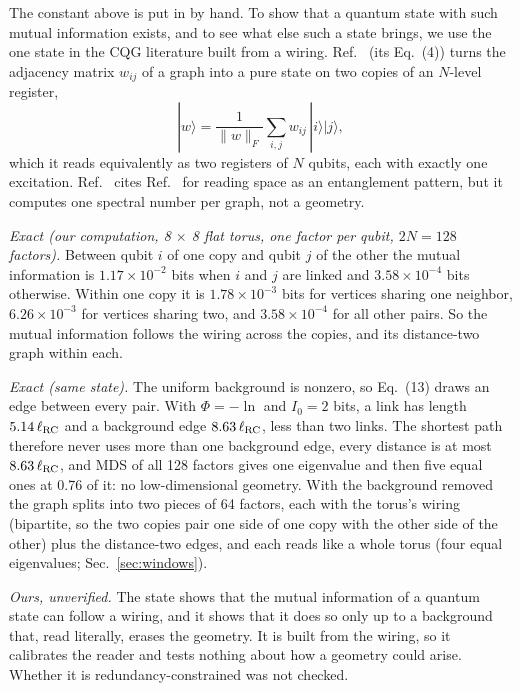 \documentclass[aps,pre,10pt,twocolumn,superscriptaddress,nofootinbib]{revtex4-2}
\begin{document}
The constant above is put in by hand. To show that a quantum state with such mutual information exists, and to see
what else such a state brings, we use the one state in the CQG literature built from a wiring. Ref.~\cite{DT17} (its
Eq.~(4)) turns the adjacency matrix $w_{ij}$ of a graph into a pure state on two copies of an $N$-level register,
\begin{equation*}
|w\rangle=\frac{1}{\lVert w\rVert_F}\sum_{i,j}w_{ij}\,|i\rangle|j\rangle ,
\end{equation*}
which it reads equivalently as two registers of $N$ qubits, each with exactly one excitation. Ref.~\cite{DT17}
cites Ref.~\cite{CCM16} for reading space as an entanglement pattern, but it computes one spectral number per
graph, not a geometry.

\emph{Exact (our computation, 8 $\times$ 8 flat torus, one factor per qubit, $2N=128$ factors).} Between qubit $i$ of
one copy and qubit $j$ of the other the mutual information is $1.17\times10^{-2}$ bits when $i$ and $j$ are linked and
$3.58\times10^{-4}$ bits otherwise. Within one copy it is $1.78\times10^{-3}$ bits for vertices sharing one neighbor,
$6.26\times10^{-3}$ for vertices sharing two, and $3.58\times10^{-4}$ for all other pairs. So the mutual information
follows the wiring across the copies, and its distance-two graph within each.

\emph{Exact (same state).} The uniform background is nonzero, so Eq.~(13) draws an edge between every pair. With
$\Phi=-\ln$ and $I_0=2$ bits, a link has length $5.14\,\ell_{\rm RC}$ and a background edge $8.63\,\ell_{\rm RC}$,
less than two links. The shortest path therefore never uses more than one background edge, every distance is at most
$8.63\,\ell_{\rm RC}$, and MDS of all 128 factors gives one eigenvalue and then five equal ones at 0.76 of it: no
low-dimensional geometry. With the background removed the graph splits into two pieces of 64 factors, each with
the torus's wiring (bipartite, so the two copies pair one side of one copy with the other side of the other) plus
the distance-two edges, and each reads like a whole torus (four equal eigenvalues; Sec.~\ref{sec:windows}).

\emph{Ours, unverified.} The state shows that the mutual information of a quantum state can follow a wiring, and it
shows that it does so only up to a background that, read literally, erases the geometry. It is built from the wiring,
so it calibrates the reader and tests nothing about how a geometry could arise. Whether it is redundancy-constrained
was not checked.
\end{document}

